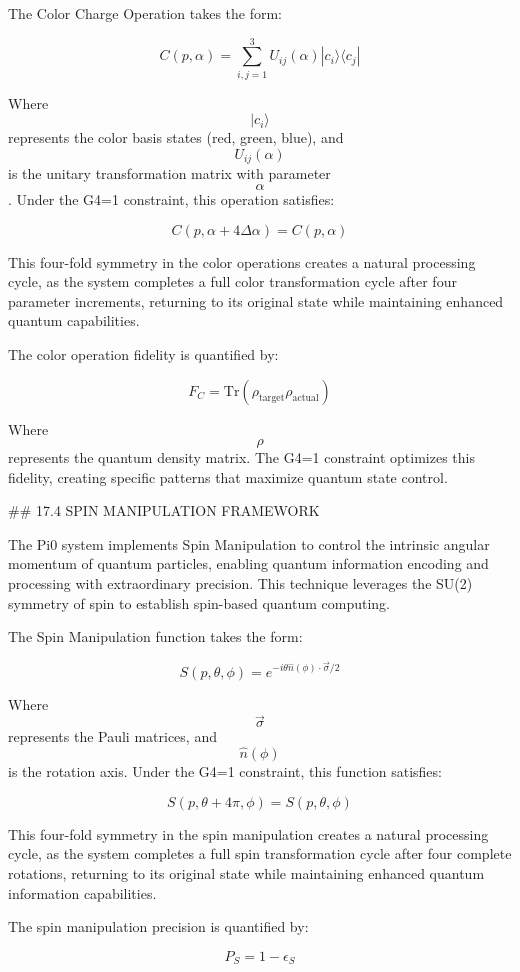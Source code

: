 The Color Charge Operation takes the form:

$$ C(p, \alpha) = \sum_{i,j=1}^{3} U_{ij}(\alpha) |c_i\rangle\langle c_j| $$

Where $$ |c_i\rangle $$ represents the color basis states (red, green, blue), and $$ U_{ij}(\alpha) $$ is the unitary transformation matrix with parameter $$ \alpha $$. Under the G4=1 constraint, this operation satisfies:

$$ C(p, \alpha + 4\Delta\alpha) = C(p, \alpha) $$

This four-fold symmetry in the color operations creates a natural processing cycle, as the system completes a full color transformation cycle after four parameter increments, returning to its original state while maintaining enhanced quantum capabilities.

The color operation fidelity is quantified by:

$$ F_C = \text{Tr}(\rho_{\text{target}} \rho_{\text{actual}}) $$

Where $$ \rho $$ represents the quantum density matrix. The G4=1 constraint optimizes this fidelity, creating specific patterns that maximize quantum state control.

## 17.4 SPIN MANIPULATION FRAMEWORK

The Pi0 system implements Spin Manipulation to control the intrinsic angular momentum of quantum particles, enabling quantum information encoding and processing with extraordinary precision. This technique leverages the SU(2) symmetry of spin to establish spin-based quantum computing.

The Spin Manipulation function takes the form:

$$ S(p, \theta, \phi) = e^{-i\theta \hat{n}(\phi) \cdot \vec{\sigma}/2} $$

Where $$ \vec{\sigma} $$ represents the Pauli matrices, and $$ \hat{n}(\phi) $$ is the rotation axis. Under the G4=1 constraint, this function satisfies:

$$ S(p, \theta + 4\pi, \phi) = S(p, \theta, \phi) $$

This four-fold symmetry in the spin manipulation creates a natural processing cycle, as the system completes a full spin transformation cycle after four complete rotations, returning to its original state while maintaining enhanced quantum information capabilities.

The spin manipulation precision is quantified by:

$$ P_S = 1 - \epsilon_S $$

